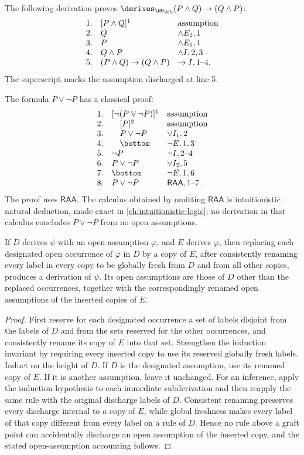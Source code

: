 \begin{example}
The following derivation proves
\(\derives_{\ND_{\CPL}}(P\land Q)\to(Q\land P)\):
\[
\begin{array}{rll}
1.&[P\land Q]^1&\text{assumption}\cr
2.&Q&\land E_2,1\cr
3.&P&\land E_1,1\cr
4.&Q\land P&\land I,2,3\cr
5.&(P\land Q)\to(Q\land P)&\to I,1\text{--}4.
\end{array}
\]
The superscript marks the assumption discharged at line 5.
\end{example}

\begin{example}
The formula \(P\lor\neg P\) has a classical proof:
\[
\begin{array}{rll}
1.&[\neg(P\lor\neg P)]^1&\text{assumption}\cr
2.&\quad[P]^2&\text{assumption}\cr
3.&\quad P\lor\neg P&\lor I_1,2\cr
4.&\quad\bottom&\neg E,1,3\cr
5.&\neg P&\neg I,2\text{--}4\cr
6.&P\lor\neg P&\lor I_2,5\cr
7.&\bottom&\neg E,1,6\cr
8.&P\lor\neg P&\mathsf{RAA},1\text{--}7.
\end{array}
\]
The proof uses \(\mathsf{RAA}\).  The calculus obtained by omitting
\(\mathsf{RAA}\) is intuitionistic natural deduction, made exact in
\cref{ch:intuitionistic-logic}; no derivation in that calculus concludes
\(P\lor\neg P\) from no open assumptions.
\end{example}

\begin{lemma}
\label{lem:nd-substitution}
If \(D\) derives \(\psi\) with an open assumption \(\varphi\), and \(E\)
derives \(\varphi\), then replacing each designated open occurrence of
\(\varphi\) in \(D\) by a copy of \(E\), after consistently renaming every
label in every copy to be globally fresh from \(D\) and from all other copies,
produces a derivation of \(\psi\).  Its open assumptions are those of \(D\)
other than the replaced occurrences, together with the correspondingly
renamed open assumptions of the inserted copies of \(E\).
\end{lemma}
\begin{proof}
First reserve for each designated occurrence a set of labels disjoint from
the labels of \(D\) and from the sets reserved for the other occurrences, and
consistently rename its copy of \(E\) into that set.  Strengthen the induction
invariant by requiring every inserted copy to use its reserved globally fresh
labels.  Induct on the height of \(D\).  If \(D\) is the designated
assumption, use its renamed copy of \(E\).  If it is another assumption, leave
it unchanged.  For an inference, apply the induction hypothesis to each
immediate subderivation and then reapply the same rule with the original
discharge labels of \(D\).  Consistent renaming preserves every discharge
internal to a copy of \(E\), while global freshness makes every label of that
copy different from every label on a rule of \(D\).  Hence no rule above a
graft point can accidentally discharge an open assumption of the inserted
copy, and the stated open-assumption accounting follows.
\end{proof}

